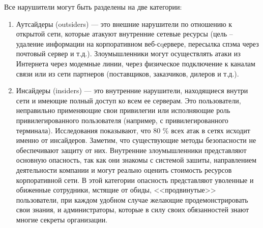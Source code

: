 Все нарушители могут быть разделены на две категории:
\begin{enumerate}
  \item Аутсайдеры (outsiders) --- это внешние нарушители по отношению к
  открытой сети, которые атакуют внутренние сетевые ресурсы (цель -- удаление
  информации на корпоративном веб-сqервере, пересылка спэма через почтовый сервер и т.д.). 
  Злоумышленники могут осуществлять атаки из Интернета через модемные линии, через физическое 
  подключение к каналам связи или из сети партнеров (поставщиков, заказчиков, дилеров и т.д.).
  \item Инсайдеры (insiders) --- это внутренние нарушители, находящиеся внутри
  сети и имеющие полный доступ ко всем ее серверам. Это пользователи,
  неправильно применяющие свои привилегии или исполняющие роль
  привилегированного пользователя (например, с привилегированного терминала).
  Исследования показывают, что 80 \% всех атак в сетях исходит именно от
  инсайдеров. Заметим, что существующие методы безопасности не обеспечивают
  защиту от них. Внутренние злоумышленники представляют основную опасность, так
  как они знакомы с системой зашиты, направлением деятельности компании и могут
  реально оценить стоимость ресурсов корпоративной сети. В этой категории опасность 
  представляют уволенные и обиженные сотрудники, мстящие от обиды, <<продвинутые>> 
  пользователи, при каждом удобном случае желающие продемонстрировать свои
  знания, и администраторы, которые в силу своих обязанностей знают многие секреты организации.
\end{enumerate} 

